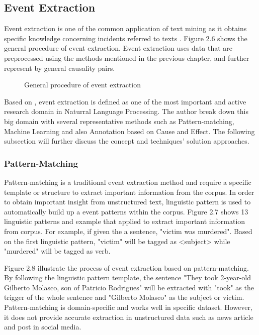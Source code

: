 \documentclass[twoside]{utmthesis}
\begin{document}
\subsection{Event Extraction}
Event extraction is one of the common application of text mining as it obtains specific knowledge concerning incidents referred to texts \citep{hogenboom2011overview}.  Figure 2.6 shows the general procedure of event extraction. Event extraction uses data that are preprocessed using the methods mentioned in the previous chapter, and further represent by general causality pairs. 

\begin{figure}[H]
	\centering
	\caption{General procedure of event extraction}
	\label{fig:eventrepresentation}
\end{figure}
\vspace{-1.5cm}

Based on \cite{xiang2019survey}, event extraction is defined as one of the most important and active research domain in Naturral Language Processing. The author break down this big domain with several representative methods such as Pattern-matching, Machine Learning and also Annotation based on Cause and Effect. The following subsection will further discuss the concept and techniques' solution approaches. 

\subsubsection{Pattern-Matching}
Pattern-matching is a traditional event extraction method and require a specific template or structure to extract important information from the corpus. In order to obtain important insight from unstructured text, linguistic pattern is used to automatically build up a event patterns within the corpus. Figure 2.7 shows 13 linguistic patterns and example that applied to extract important information from corpus. For example, if given the a sentence, "victim was murdered". Based on the first linguistic pattern, "victim" will be tagged as <subject> while "murdered" will be tagged as verb. 

Figure 2.8 illustrate the process of event extraction based on pattern-matching. By following the linguistic pattern template, the sentence "They took 2-year-old Gilberto Molasco, son of Patricio Rodrigues" will be extracted with "took" as the trigger of the whole sentence and "Gilberto Molasco" as the subject or victim. Pattern-matching is domain-specific and works well in specific dataset. However, it does not provide accurate extraction in unstructured data such as news article and post in social media. 
\end{document}
